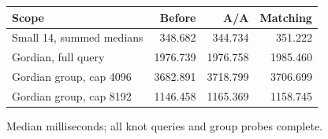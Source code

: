 \begin{center}\small
\begin{tabular}{@{}lrrr@{}}
\toprule
Scope & Before & A/A & Matching \\
\midrule
Small 14, summed medians & 348.682 & 344.734 & 351.222 \\
Gordian, full query & 1976.739 & 1976.758 & 1985.460 \\
Gordian group, cap 4096 & 3682.891 & 3718.799 & 3706.699 \\
Gordian group, cap 8192 & 1146.458 & 1165.369 & 1158.745 \\
\bottomrule
\end{tabular}
\end{center}
Median milliseconds; all knot queries and group probes complete.
